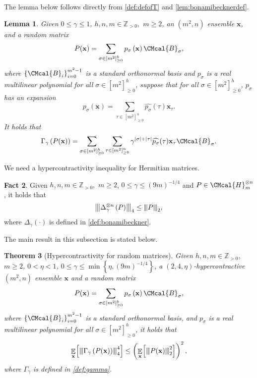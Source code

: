 \documentclass[10pt,a4paper]{article}
\def\B{\CMcal{B}}
\def\H{\CMcal{H}}
\theoremstyle{plain}
\newtheorem{theorem}{Theorem}[section]
\newtheorem{lemma}[theorem]{Lemma}
\theoremstyle{definition}
\newtheorem{fact}[theorem]{Fact}
\newcommand {\minusspace} {\: \! \!}
\newcommand {\Fn} [2] {\ensuremath{ #1 \minusspace \Br{ #2 } }}
\newcommand {\set} [1] {\ensuremath{ \left\lbrace #1 \right\rbrace }}
\newcommand {\br} [1] {\ensuremath{ \left( #1 \right) }}
\newcommand {\Br} [1] {\ensuremath{ \left[ #1 \right] }}
\newcommand {\ab} [1] {\ensuremath{ \left| #1 \right| }}
\DeclareMathOperator*{\bigE}{\mathbb{E}}
\newcommand {\expec} [2] {\Fn{\bigE_{\substack{#1}}}{#2}}
\newcommand{\nnorm}[1]{{\left\vert\kern-0.25ex\left\vert\kern-0.25ex\left\vert #1
		\right\vert\kern-0.25ex\right\vert\kern-0.25ex\right\vert}}
\newcommand{\posint}{{\mathbb Z}_{>0}}
\newcommand{\randx}{\ensuremath{\mathbf{x}}}
\newcommand{\1}{\mathbb{1}} %
\begin{document}
The lemma below follows directly from \cref{def:defofT} and \cref{lem:bonamibecknerdef}.

\begin{lemma}\label{lem:gammaoperator}
	Given $0\leq\gamma\leq 1$, $h,n,m\in\posint,$ $m\geq 2$, an $(m^2,n)$ ensemble $\randx$, and a random matrix
 \begin{equation*}
P(\randx)=\sum_{\sigma\in\Br{m^2}_{\geq0}^h}p_\sigma\br{\randx}\B_\sigma,
	\end{equation*}
	where $\set{\B_i}_{i=0}^{m^2-1}$ is a standard orthonormal basis and $p_\sigma$ is a real multilinear polynomial for all $\sigma\in\Br{m^2}_{\geq0}^h$, suppose that for all $\sigma\in\Br{m^2}_{\geq0}^h$, $p_\sigma$ has an expansion
	\[p_\sigma(\randx)=\sum_{\tau\in\Br{m^2}_{\geq0}^n}\widehat{p_\sigma}(\tau)\randx_\tau.\]
	 It holds that
	\begin{equation}\label{eqn:gamma}
	\Gamma_{\gamma}\br{P(\randx)}=\sum_{\sigma\in\Br{m^2}_{\geq0}^h}\sum_{\tau\in\Br{m^2}_{\geq0}^n}\gamma^{\ab{\sigma}+\ab{\tau}}\widehat{p_\sigma}(\tau)\randx_\tau\B_{\sigma}.
	\end{equation}
\end{lemma}

We need a hypercontractivity inequality for Hermitian matrices.
	\begin{fact}\label{lem:multihypercontractivity}\cite[Lemma 8.3]{qin2021nonlocal}
		Given $h,n,m\in\posint,$ $m\geq 2$, $0\leq\gamma\leq\br{9m}^{-1/4}$ and $P\in\H_m^{\otimes n}$, it holds that$$\nnorm{\Delta_\gamma^{\otimes n}\br{P}}_{4}\leq\nnorm{P}_2,$$
  where $\Delta_{\gamma}\br{\cdot}$ is defined in \cref{def:bonamibeckner}.
	\end{fact}
	
	The main result in this subsection is stated below.

	\begin{theorem}[Hypercontractivity for random matrices]\label{lem:hypercontractivity}
		Given $h,n,m\in\posint,$ $m\geq 2$, $0<\eta<1$, $0\leq\gamma\leq\min\set{\eta,\br{9m}^{-1/4}}$, a $(2,4,\eta)$-hypercontractive $(m^2,n)$ ensemble $\randx$ and a random matrix
 \begin{equation*}
P(\randx)=\sum_{\sigma\in[m^2]_{\geq0}^h}p_\sigma\br{\randx}\B_\sigma,
	\end{equation*}
	where $\set{\B_i}_{i=0}^{m^2-1}$ is a standard orthonormal basis, and $p_\sigma$ is a real multilinear polynomial for all $\sigma\in[m^2]_{\geq0}^h$, it holds that
		\[\expec{\randx}{\nnorm{\Gamma_{\gamma}\br{P(\randx)}}_4^4}\leq \br{\expec{\randx}{\nnorm{P(\randx)}_2^2}}^{2},\]
		where $\Gamma_\gamma$ is defined in \cref{def:gamma}.
	\end{theorem}	
	
\end{document}
